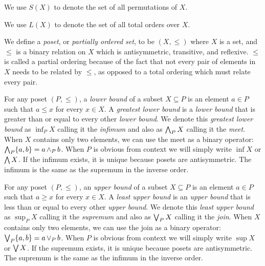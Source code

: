 	\begin{definition}
		We use $S(X)$ to denote the set of all permutations of $X$.
	\end{definition}

	\begin{definition}
		We use $L(X)$ to denote the set of all total orders over $X$.
	\end{definition}

	\begin{definition}
		We define a \emph{poset}, or \emph{partially ordered set}, to be $(X, \le)$ where $X$ is a set, and $\le$ is a binary relation on $X$ which is antisymmetric, transitive, and reflexive. $\le$ is called a partial ordering because of the fact that not every pair of elements in $X$ needs to be related by $\le$, as opposed to a total ordering which must relate every pair.
	\end{definition}

	\begin{definition}
		For any poset $(P, \le)$, a \emph{lower bound} of a subset $X \subseteq P$ is an element $a \in P$ such that $a \le x$ for every $x \in X$. A \emph{greatest lower bound} is a \emph{lower bound} that is greater than or equal to every other \emph{lower bound}. We denote this \emph{greatest lower bound} as $\inf_P X$ calling it the \emph{infimum} \cite{birkhoﬀ1967lattice} and also as $\operatorname{\bigwedge}_P X$ calling it the \emph{meet}. When $X$ contains only two elements, we can use the meet as a binary operator: $\operatorname{\bigwedge}_P \{a, b\} = a \operatorname{\wedge}_P b$. When $P$ is obvious from context we will simply write $\inf X$ or $\operatorname{\bigwedge} X$. If the infimum exists, it is unique because posets are antisymmetric. The infimum is the same as the supremum in the inverse order.
	\end{definition}

	\begin{definition}
		For any poset $(P, \le)$, an \emph{upper bound} of a subset $X \subseteq P$ is an element $a \in P$ such that $a \ge x$ for every $x \in X$. A \emph{least upper bound} is an \emph{upper bound} that is less than or equal to every other \emph{upper bound}. We denote this \emph{least upper bound} as $\sup_P X$ calling it the \emph{supremum} \cite{birkhoﬀ1967lattice} and also as $\operatorname{\bigvee}_P X$ calling it the \emph{join}. When $X$ contains only two elements, we can use the join as a binary operator: $\operatorname{\bigvee}_P \{a, b\} = a \operatorname{\vee}_P b$. When $P$ is obvious from context we will simply write $\sup X$ or $\operatorname{\bigvee} X$. If the supremum exists, it is unique because posets are antisymmetric. The supremum is the same as the infimum in the inverse order.
	\end{definition}

